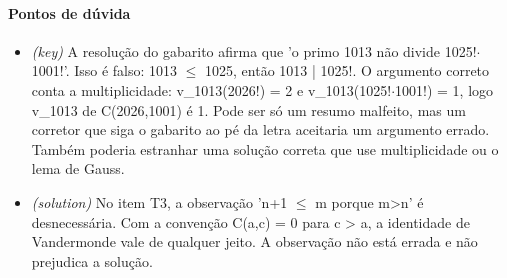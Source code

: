 \documentclass{article}%
\begin{document}
\paragraph{Pontos de dúvida}%
\begin{itemize}%
\item%
\textit{(key)} A resolução do gabarito afirma que 'o primo 1013 não divide 1025!$\cdot$1001!'. Isso é falso: 1013 $\leq$ 1025, então 1013 | 1025!. O argumento correto conta a multiplicidade: v\_1013(2026!) = 2 e v\_1013(1025!$\cdot$1001!) = 1, logo v\_1013 de C(2026,1001) é 1. Pode ser só um resumo malfeito, mas um corretor que siga o gabarito ao pé da letra aceitaria um argumento errado. Também poderia estranhar uma solução correta que use multiplicidade ou o lema de Gauss.%
\item%
\textit{(solution)} No item T3, a observação 'n+1 $\leq$ m porque m>n' é desnecessária. Com a convenção C(a,c) = 0 para c > a, a identidade de Vandermonde vale de qualquer jeito. A observação não está errada e não prejudica a solução.%
\end{itemize}%
\end{document}
